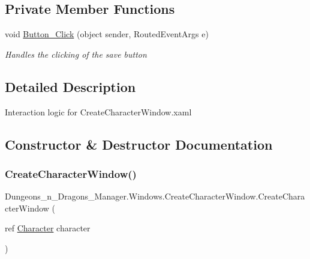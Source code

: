 \subsection*{Private Member Functions}
\begin{DoxyCompactItemize}
\item 
void \mbox{\hyperlink{class_dungeons__n___dragons___manager_1_1_windows_1_1_create_character_window_aed6bac0f0b6101a3f9e0feffff6f8300}{Button\+\_\+\+Click}} (object sender, Routed\+Event\+Args e)
\begin{DoxyCompactList}\small\item\em Handles the clicking of the save button \end{DoxyCompactList}\end{DoxyCompactItemize}


\subsection{Detailed Description}
Interaction logic for Create\+Character\+Window.\+xaml 



\subsection{Constructor \& Destructor Documentation}
\mbox{\label{class_dungeons__n___dragons___manager_1_1_windows_1_1_create_character_window_ad28df073ed278960a647204c5d82e42d}} 
\subsubsection{\texorpdfstring{Create\+Character\+Window()}{CreateCharacterWindow()}}
{\footnotesize\ttfamily Dungeons\+\_\+n\+\_\+\+Dragons\+\_\+\+Manager.\+Windows.\+Create\+Character\+Window.\+Create\+Character\+Window (\begin{DoxyParamCaption}\item[{ref \mbox{\hyperlink{class_dungeons__n___dragons___manager_1_1_models_1_1_character}{Character}}}]{character }\end{DoxyParamCaption})\hspace{0.3cm}{\ttfamily [inline]}}



